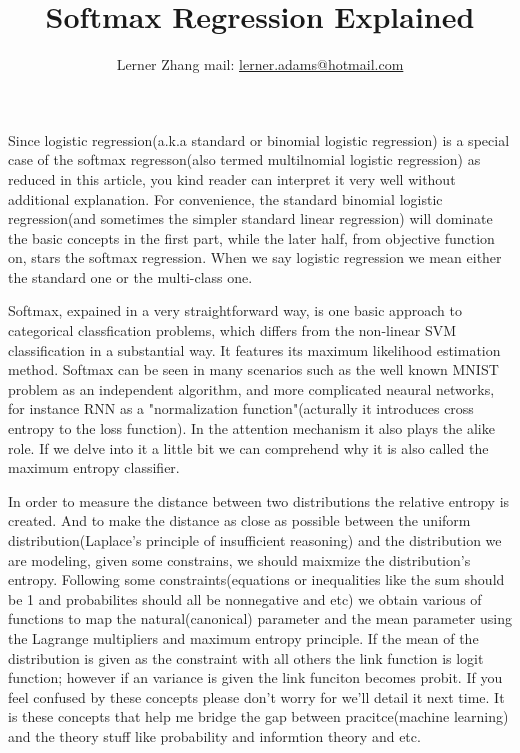 \documentclass[a4paper]{article}
\title{Softmax Regression Explained}
\author{Lerner Zhang  mail: \href{mailto:lerner.adams@hotmail.com}{lerner.adams@hotmail.com}}
\begin{document}
\maketitle

Since logistic regression(a.k.a standard or binomial logistic regression) is a special case of the softmax regresson(also termed multilnomial logistic regression) as reduced in this article, you kind reader can interpret it very well without additional explanation. For convenience, the standard binomial logistic regression(and sometimes the simpler standard linear regression) will dominate the basic concepts in the first part, while the later half, from objective function on, stars the softmax regression. When we say logistic regression we mean either the standard one or the multi-class one.

Softmax, expained in a very straightforward way, is one basic approach to categorical classfication problems, which differs from the non-linear SVM classification in a substantial way. It features its maximum likelihood estimation method. Softmax can be seen in many scenarios such as the well known MNIST problem as an independent algorithm, and more complicated neaural networks, for instance RNN as a "normalization function"(acturally it introduces cross entropy to the loss function). In the attention mechanism it also plays the alike role. If we delve into it a little bit we can comprehend why it is also called the maximum entropy classifier. 

In order to measure the distance between two distributions the relative entropy is created. And to make the distance as close as possible between the uniform distribution(Laplace's principle of insufficient reasoning) and the distribution we are modeling, given some constrains, we should maixmize the distribution's entropy. Following some constraints(equations or inequalities like the sum should be 1 and probabilites should all be nonnegative and etc) we obtain various of functions to map the natural(canonical) parameter and the mean parameter using the Lagrange multipliers and maximum entropy principle. If the mean of the distribution is given as the constraint with all others the link function is logit function; however if an variance is given the link funciton becomes probit. If you feel confused by these concepts please don't worry for we'll detail it next time. It is these concepts that help me bridge the gap between pracitce(machine learning) and the theory stuff like probability and informtion theory and etc.
\end{document}
